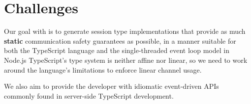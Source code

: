 \section{Challenges}
\label{section:nodechallenges}

Our goal with \nodecodegen is to
generate session type implementations that
provide as much \textbf{static} communication safety guarantees
as possible,
in a manner suitable for both the TypeScript language 
and the single-threaded event loop model in Node.js
TypeScript's type system
is neither affine nor linear, so we need to work around the 
language's limitations to enforce linear channel usage.

We also aim to provide the developer with
idiomatic event-driven APIs commonly found in
server-side TypeScript development.